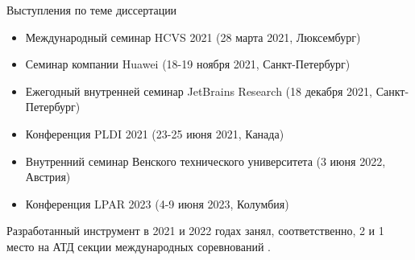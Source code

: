 \documentclass[22pt,aspectratio=169]{beamer}
\begin{document}
\begin{frame}{Выступления по теме диссертации}
\begin{itemize}
\item Международный семинар HCVS 2021 (28 марта 2021, Люксембург)
\item Семинар компании Huawei (18-19 ноября 2021, Санкт-Петербург)
\item Ежегодный внутренней семинар JetBrains Research (18 декабря 2021, Санкт-Петербург)
\item Конференция PLDI 2021 (23-25 июня 2021, Канада)
\item Внутренний семинар Венского технического университета (3 июня 2022, Австрия)
\item Конференция LPAR 2023 (4-9 июня 2023, Колумбия)
\end{itemize}

Разработанный инструмент в 2021 и 2022 годах занял, соответственно, 2 и 1 место на АТД секции международных соревнований \chccomp{}.
\end{frame}




\end{document}
